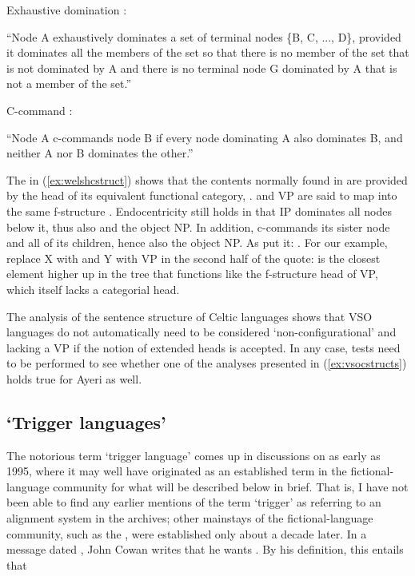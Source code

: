 \pex
\a Exhaustive domination \citep[121]{carnie2013}:\smallskip

	``Node A exhaustively dominates a set of terminal nodes \{B, C, ..., D\},
	provided it dominates all the members of the set so that there is no
	member of the set that is not dominated by A and there is no terminal node
	G dominated by A that is not a member of the set.''

\a C-command \citep[127]{carnie2013}:\smallskip

	``Node A c-commands node B if every node dominating A also dominates B, and
	neither A nor B dominates the other.''
\xe

The \Avm{} in (\ref{ex:welshcstruct}) shows that the contents normally found in
 are provided by the head of its equivalent functional category,
.  and VP are said to map into the same f-structure \citep
[136]{bresnan2016}. Endocentricity still holds in that IP dominates all nodes
below it, thus also  and the object NP. In addition, 
c-commands its sister node and all of its children, hence also the object NP.
As \citet{bresnan2016} put it: . For our example, replace X with
 and Y with VP in the second half of the quote:  is the
closest element higher up in the tree that functions like the f-structure head
of VP, which itself lacks a categorial head.

The analysis of the sentence structure of Celtic languages shows that VSO
languages do not automatically need to be considered `non-configurational' and
lacking a VP if the notion of extended heads is accepted. In any case, tests
need to be performed to see whether one of the analyses presented in
(\ref{ex:vsocstructs}) holds true for Ayeri as well.

\subsection[‘Trigger languages’]{`Trigger languages'}

The notorious term `trigger language' comes up in discussions on
 as early as 1995, where it may well have originated as an
established term in the fictional-language community for what will be described
below in brief. That is, I have not been able to find any earlier mentions of
the term `trigger' as referring to an alignment system in the archives; other
mainstays of the fictional-language community, such as the ,
were established only about a decade later. In a message dated
, John Cowan writes that he wants . By his definition, this entails that

